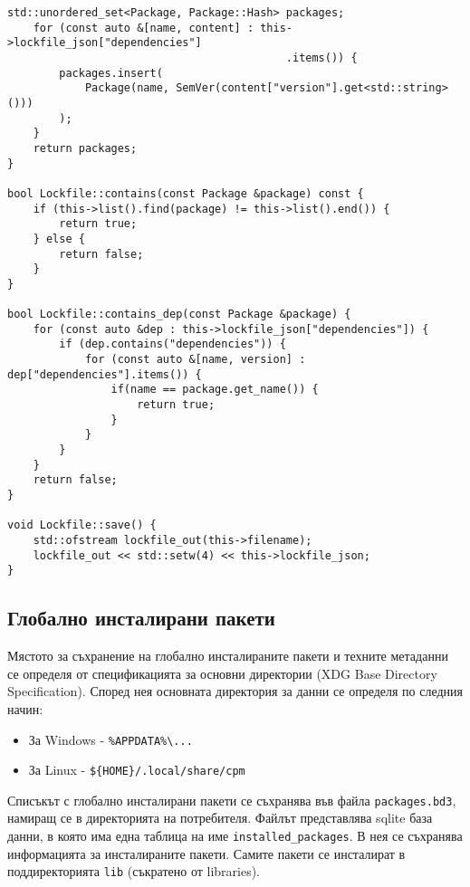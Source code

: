 \begin{lstlisting}[style=cpp,
				   caption={Файл, описващ графа на зависимостите на
				   			текущия пакет},
				   label={lst:lockfile}]
	std::unordered_set<Package, Package::Hash> packages;
	for (const auto &[name, content] : this->lockfile_json["dependencies"]
									       .items()) {
		packages.insert(
			Package(name, SemVer(content["version"].get<std::string>()))
		);
	}
	return packages;
}

bool Lockfile::contains(const Package &package) const {
	if (this->list().find(package) != this->list().end()) {
		return true;
	} else {
		return false;
	}
}

bool Lockfile::contains_dep(const Package &package) {
	for (const auto &dep : this->lockfile_json["dependencies"]) {
		if (dep.contains("dependencies")) {
			for (const auto &[name, version] : dep["dependencies"].items()) {
				if(name == package.get_name()) {
					return true;
				}
			}
		}
	}
	return false;
}

void Lockfile::save() {
	std::ofstream lockfile_out(this->filename);
	lockfile_out << std::setw(4) << this->lockfile_json;
}
\end{lstlisting}


\subsection{Глобално инсталирани пакети}

Мястото за съхранение на глобално инсталираните пакети и техните метаданни се
определя от спецификацията за основни директории \cite{xdg} (XDG Base Directory
Specification). Според нея основната директория за данни се определя по следния
начин:

\begin{itemize}
	\item За Windows - \texttt{\%APPDATA\%\textbackslash...}
	\item За Linux - \texttt{\$\{HOME\}/.local/share/cpm}
\end{itemize}

Списъкът с глобално инсталирани пакети се съхранява във файла
\texttt{packages.bd3}, намиращ се в директорията на потребителя. Файлът
представлява sqlite база данни, в която има една таблица на име
\texttt{installed\_packages}. В нея се съхранява информацията за инсталираните
пакети. Самите пакети се инсталират в поддиректорията \texttt{lib} (съкратено от
libraries).

